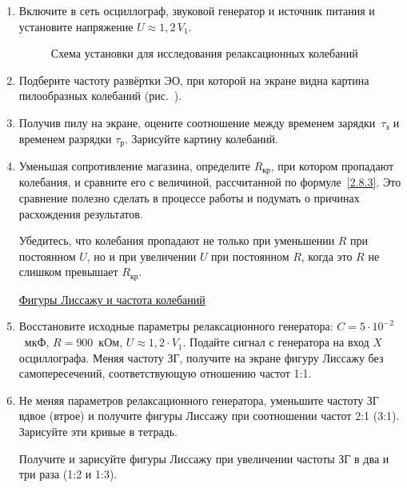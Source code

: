 \begin{lab:task}
\begin{enumerate}
		\item Включите в сеть осциллограф, звуковой генератор и источник питания и установите напряжение $U\approx 1,2\,V_1$.

\begin{figure}[h!] 
	\caption{Схема установки для исследования релаксационных колебаний}
\end{figure}

		\item Подберите частоту развёртки ЭО, при которой на экране видна картина пилообразных колебаний (рис.~).

		\item Получив пилу на экране, оцените соотношение между временем зарядки~$\tau_{\text{з}}$ и временем разрядки $\tau_{\text{р}}$.
Зарисуйте картину колебаний.

		\item Уменьшая сопротивление магазина, определите $R_{\text{кр}}$, при котором пропадают колебания, и сравните его с величиной,
рассчитанной по формуле~\eqref{2.8.3}. Это сравнение полезно сделать в процессе работы и подумать о причинах расхождения
результатов.

Убедитесь, что колебания пропадают не только при уменьшении $R$ при постоянном $U$, но и при увеличении $U$ при
постоянном $R$, когда это $R$ не слишком превышает $R_{\text{кр}}$.

		    \begin{center}
		    \underline{Фигуры Лиссажу и частота колебаний}
		    \end{center}
		    
		\item Восстановите исходные параметры релаксационного генератора: $C=5\cdot 10^{-2}$~мкФ, $R=900$~кОм, $U\approx 1,2 \cdot
V_1$. Подайте сигнал с генератора на вход $X$ осциллографа. Меняя частоту ЗГ, получите на экране фигуру Лиссажу без
самопересечений, соответствующую отношению частот 1:1.

		\item Не меняя параметров релаксационного генератора, уменьшите частоту ЗГ вдвое (втрое) и получите фигуры Лиссажу при
соотношении частот 2:1 (3:1). Зарисуйте эти кривые в тетрадь.

Получите и зарисуйте фигуры Лиссажу при увеличении частоты ЗГ в два и три раза (1:2 и 1:3).


\end{enumerate}
\end{lab:task}
